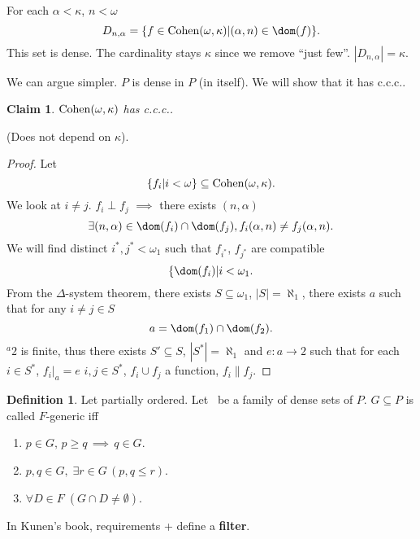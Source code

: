 \documentclass[11pt,pdftex,twoside,a4paper]{article}
\newcommand{\B}[1]{\textbf{#1}}
\newcommand{\Cohen}{\mathop{\rm Cohen}\nolimits}
\newcommand{\ccc}{c.c.c.}
\newtheorem{claim}[thm]{Claim}
\theoremstyle{definition}
\newtheorem{ldef}[thm]{Definition}
\begin{document}
For each \(\alpha < \kappa\), \(n < \omega\)
\begin{equation*}
D_{n,\alpha} = \{f\in \Cohen(\omega,\kappa)| (\alpha,n)\in\dom(f)\}.
\end{equation*}
This set is dense. The cardinality stays \(\kappa\)
since we remove ``just few''.
\(|D_{n,\alpha}|=\kappa\).

We can argue simpler. $P$ is dense in $P$ (in itself).
We will show that it has \ccc.

\begin{claim}
\(\Cohen(\omega,\kappa)\) has \ccc.
\end{claim}
(Does not depend on \(\kappa\)).
\begin{proof}
Let
\begin{equation*}
\{f_i| i < \omega\} \subseteq \Cohen(\omega,\kappa).
\end{equation*}
We look at \(i\neq j\).
\(f_i \perp f_j\)  \(\implies\) there exists \((n,\alpha)\)
\begin{equation*}
\exists(n,\alpha) \in \dom(f_i)\cap\dom(f_j), f_i(\alpha,n) \neq f_j(\alpha,n).
\end{equation*}
We will find distinct \(i^*,j^* < \omega_1\) such that
\(f_{i^*}\), \(f_{j^*}\) are compatible
\begin{equation*}
\{\dom(f_i) | i < \omega_1.
\end{equation*}
From the \(\Delta\)-system theorem, there exists \(S\subseteq \omega_1\),
\(|S|=\aleph_1\), there exists $a$ such that for any \(i\neq j\in S\)
\begin{equation*}
a = \dom(f_1) \cap \dom(f_2).
\end{equation*}
\({}^a 2\) is finite, thus there exists \(S'\subseteq S\), \(|S^*| = \aleph_1\)
and \(e: a\to 2\) such that for each \(i\in S^*\), \(f_i|_a = e\)
\(i,j\in S^*\), \(f_i \cup f_j\) a function, \(f_i\| f_j\).
\end{proof}

\begin{ldef}
Let  partially ordered.
Let \scrF\ be a family of dense sets of $P$. \(G\subseteq P\)
is called $F$-generic iff
\begin{enumerate}
\item \(p\in G,\,p \geq q\,\implies\, q\in G\).
\item \(p,q\in G,\; \exists r\in G\, (p,q \leq r)\).
\item \(\forall D\in F\; (G\cap D\neq \emptyset)\).
\end{enumerate}
\end{ldef}
In Kunen's book, requirements + define a \B{filter}.
\end{document}
